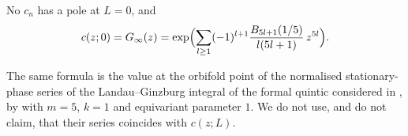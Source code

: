 
\begin{thm}
\label{thm:gam-ginf}
No $c_n$ has a pole at $L=0$, and
\begin{equation}
\label{eq:gam-ginf}
c(z;0)=G_{\infty}(z)=\exp\Bigl(\sum_{l\geq 1}(-1)^{l+1}\frac{B_{5l+1}(1/5)}{l(5l+1)}\,z^{5l}\Bigr).
\end{equation}
\end{thm}

The same formula is the value at the orbifold point of the normalised stationary-phase series of the Landau--Ginzburg integral of the formal quintic considered in \cite{GJR18}, by \cite[Lemma~7.7, (37)]{GJR18} with $m=5$, $k=1$ and equivariant parameter $1$. We do not use, and do not claim, that their series coincides with $c(z;L)$.

